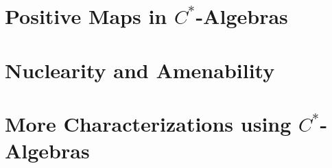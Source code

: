 \section{Positive Maps in \texorpdfstring{$C^{\ast}$-Algebras}{C*-Algebras}}%

\section{Nuclearity and Amenability}%

\section{More Characterizations using $C^{\ast}$-Algebras}%

